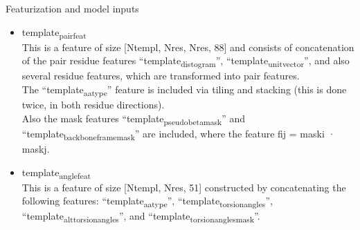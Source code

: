 \documentclass[presentation, smaller]{beamer}
\begin{document}
\begin{frame}[label={sec:org6352966}]{Featurization and model inputs \cite{jumperHighlyAccurateProtein2021}}
\begin{itemize}
\item \alert{template\textsubscript{pair}\textsubscript{feat}} \\
This is a feature of size [Ntempl, Nres, Nres, 88] and consists of concatenation of the pair residue features “template\textsubscript{distogram}”, “template\textsubscript{unit}\textsubscript{vector}”, and also several residue features, which are transformed into pair features. \\
The “template\textsubscript{aatype}” feature is included via tiling and stacking (this is done twice, in both residue directions). \\
Also the mask features “template\textsubscript{pseudo}\textsubscript{beta}\textsubscript{mask}” and “template\textsubscript{backbone}\textsubscript{frame}\textsubscript{mask}” are included, where the feature fij = maski · maskj. \\
\item \alert{template\textsubscript{angle}\textsubscript{feat}} \\
This is a feature of size [Ntempl, Nres, 51] constructed by concatenating the following features: “template\textsubscript{aatype}”, “template\textsubscript{torsion}\textsubscript{angles}”, “template\textsubscript{alt}\textsubscript{torsion}\textsubscript{angles}”, and “template\textsubscript{torsion}\textsubscript{angles}\textsubscript{mask}”.
\end{itemize}
\end{frame}
\end{document}
